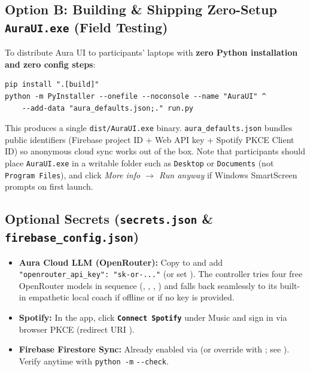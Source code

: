 \documentclass[11pt,a4paper]{article}
\newcommand{\uictrl}[1]{\texttt{\textbf{#1}}}
\begin{document}
\subsection{Option B: Building \& Shipping Zero-Setup \texttt{AuraUI.exe} (Field Testing)}
To distribute Aura UI to participants' laptops with \textbf{zero Python installation and zero config steps}:
\begin{verbatim}
pip install ".[build]"
python -m PyInstaller --onefile --noconsole --name "AuraUI" ^
    --add-data "aura_defaults.json;." run.py
\end{verbatim}
This produces a single \texttt{dist/AuraUI.exe} binary. \texttt{aura\_defaults.json} bundles public identifiers (Firebase project ID + Web API key + Spotify PKCE Client ID) so anonymous cloud sync works out of the box. Note that participants should place \texttt{AuraUI.exe} in a writable folder such as \texttt{Desktop} or \texttt{Documents} (not \texttt{Program Files}), and click \textit{More info $\rightarrow$ Run anyway} if Windows SmartScreen prompts on first launch.

\subsection{Optional Secrets (\texttt{secrets.json} \& \texttt{firebase\_config.json})}
\begin{itemize}[leftmargin=1.5em, itemsep=2pt]
    \item \textbf{Aura Cloud LLM (OpenRouter):} Copy  to  and add \texttt{"openrouter\_api\_key": "sk-or-..."} (or set ). The controller tries four free OpenRouter models in sequence (, , , ) and falls back seamlessly to its built-in empathetic local coach if offline or if no key is provided.
    \item \textbf{Spotify:} In the app, click \uictrl{Connect Spotify} under Music and sign in via browser PKCE (redirect URI ).
    \item \textbf{Firebase Firestore Sync:} Already enabled via  (or override with ; see ). Verify anytime with \texttt{python -m}  \texttt{{-}{-}check}.
\end{itemize}

\end{document}

